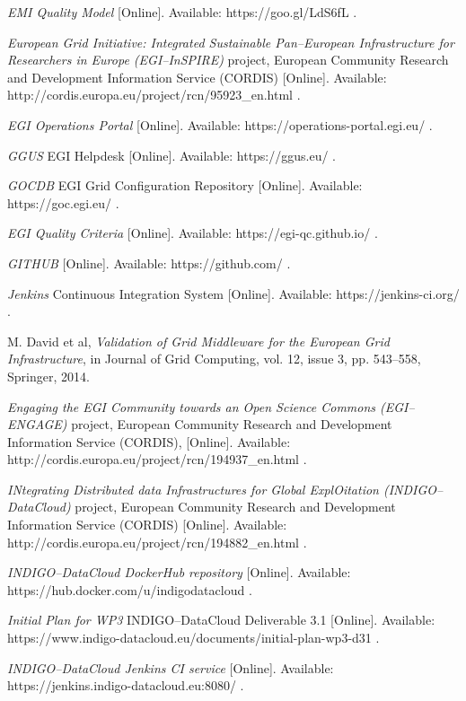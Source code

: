 \documentclass[journal]{IEEEtran}
\begin{document}
\begin{thebibliography}{1}
\emph{EMI Quality Model} [Online]. Available: https://goo.gl/LdS6fL .

\emph{European Grid Initiative: Integrated Sustainable Pan--European
Infrastructure for Researchers in Europe (EGI--InSPIRE)} project, European
Community Research and Development Information Service (CORDIS) [Online]. Available:
http://cordis.europa.eu/project/rcn/95923\_en.html .

\emph{EGI Operations Portal} [Online]. Available:
https://operations-portal.egi.eu/ .

\emph{GGUS} EGI Helpdesk [Online]. Available:
https://ggus.eu/ .

\emph{GOCDB} EGI Grid Configuration Repository [Online]. Available:
https://goc.egi.eu/ .

\emph{EGI Quality Criteria} [Online]. Available:
https://egi-qc.github.io/ .

\emph{GITHUB} [Online]. Available:
https://github.com/ .

\emph{Jenkins} Continuous Integration System [Online]. Available:
https://jenkins-ci.org/ .

M. David et al, \emph{Validation of Grid Middleware for the European Grid
Infrastructure}, in Journal of Grid Computing, vol. 12, issue 3, pp. 543--558,
Springer, 2014.

\emph{Engaging the EGI Community towards an Open Science Commons (EGI--ENGAGE)}
project, European Community Research and Development Information Service
(CORDIS), [Online]. Available:  http://cordis.europa.eu/project/rcn/194937\_en.html .

\emph{INtegrating Distributed data Infrastructures for Global ExplOitation
(INDIGO--DataCloud)} project, European Community Research and Development
Information Service (CORDIS) [Online]. Available:
http://cordis.europa.eu/project/rcn/194882\_en.html .

\emph{INDIGO--DataCloud DockerHub repository} [Online]. Available:
https://hub.docker.com/u/indigodatacloud .

\emph{Initial Plan for WP3} INDIGO--DataCloud Deliverable 3.1 [Online]. Available:
https://www.indigo-datacloud.eu/documents/initial-plan-wp3-d31 .

\emph{INDIGO--DataCloud Jenkins CI service} [Online]. Available:
https://jenkins.indigo-datacloud.eu:8080/ .


\end{thebibliography}
\end{document}
